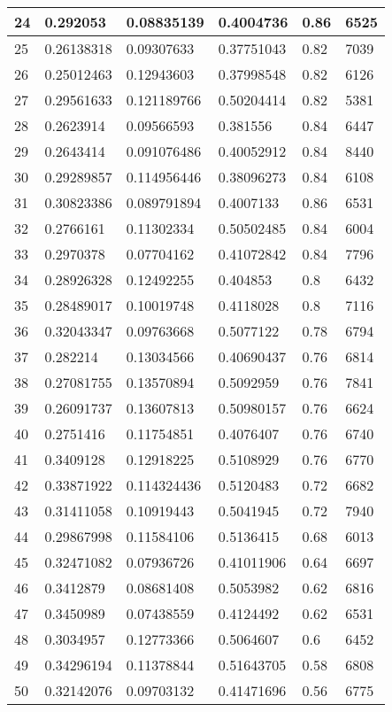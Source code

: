\begin{longtable}{|l|l|l|l|l|l|}
24 & 0.292053 & 0.08835139 & 0.4004736 & 0.86 & 6525 \\ \hline 
25 & 0.26138318 & 0.09307633 & 0.37751043 & 0.82 & 7039 \\ \hline 
26 & 0.25012463 & 0.12943603 & 0.37998548 & 0.82 & 6126 \\ \hline 
27 & 0.29561633 & 0.121189766 & 0.50204414 & 0.82 & 5381 \\ \hline 
28 & 0.2623914 & 0.09566593 & 0.381556 & 0.84 & 6447 \\ \hline 
29 & 0.2643414 & 0.091076486 & 0.40052912 & 0.84 & 8440 \\ \hline 
30 & 0.29289857 & 0.114956446 & 0.38096273 & 0.84 & 6108 \\ \hline 
31 & 0.30823386 & 0.089791894 & 0.4007133 & 0.86 & 6531 \\ \hline 
32 & 0.2766161 & 0.11302334 & 0.50502485 & 0.84 & 6004 \\ \hline 
33 & 0.2970378 & 0.07704162 & 0.41072842 & 0.84 & 7796 \\ \hline 
34 & 0.28926328 & 0.12492255 & 0.404853 & 0.8 & 6432 \\ \hline 
35 & 0.28489017 & 0.10019748 & 0.4118028 & 0.8 & 7116 \\ \hline 
36 & 0.32043347 & 0.09763668 & 0.5077122 & 0.78 & 6794 \\ \hline 
37 & 0.282214 & 0.13034566 & 0.40690437 & 0.76 & 6814 \\ \hline 
38 & 0.27081755 & 0.13570894 & 0.5092959 & 0.76 & 7841 \\ \hline 
39 & 0.26091737 & 0.13607813 & 0.50980157 & 0.76 & 6624 \\ \hline 
40 & 0.2751416 & 0.11754851 & 0.4076407 & 0.76 & 6740 \\ \hline 
41 & 0.3409128 & 0.12918225 & 0.5108929 & 0.76 & 6770 \\ \hline 
42 & 0.33871922 & 0.114324436 & 0.5120483 & 0.72 & 6682 \\ \hline 
43 & 0.31411058 & 0.10919443 & 0.5041945 & 0.72 & 7940 \\ \hline 
44 & 0.29867998 & 0.11584106 & 0.5136415 & 0.68 & 6013 \\ \hline 
45 & 0.32471082 & 0.07936726 & 0.41011906 & 0.64 & 6697 \\ \hline 
46 & 0.3412879 & 0.08681408 & 0.5053982 & 0.62 & 6816 \\ \hline 
47 & 0.3450989 & 0.07438559 & 0.4124492 & 0.62 & 6531 \\ \hline 
48 & 0.3034957 & 0.12773366 & 0.5064607 & 0.6 & 6452 \\ \hline 
49 & 0.34296194 & 0.11378844 & 0.51643705 & 0.58 & 6808 \\ \hline 
50 & 0.32142076 & 0.09703132 & 0.41471696 & 0.56 & 6775 \\ \hline 
\end{longtable}